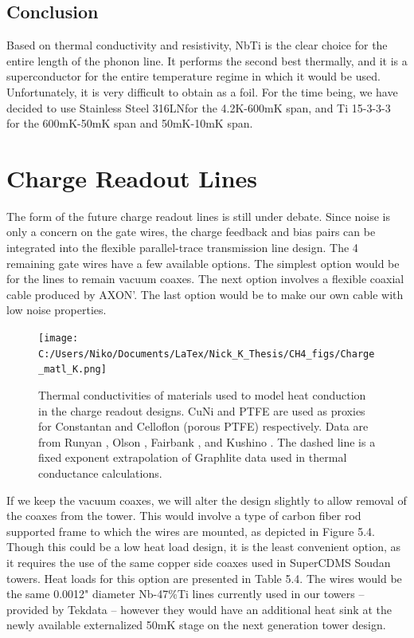 \documentclass{report}
\begin{document}
\subsection{Conclusion}

Based on thermal conductivity and resistivity, NbTi is the clear choice for the entire length of the phonon line. It performs the second best thermally, and it is a superconductor for the entire temperature regime in which it would be used. Unfortunately, it is very difficult to obtain as a foil. For the time being, we have decided to use Stainless Steel 316LN\footnotemark for the 4.2K-600mK span,
and Ti 15-3-3-3 for the 600mK-50mK span and 50mK-10mK span.\footnotemark


\section{Charge Readout Lines}

The form of the future charge readout lines is still under debate. Since noise is only a concern on the gate wires, the charge feedback and bias pairs can be integrated into the flexible parallel-trace transmission line design. The 4 remaining gate wires have a few available options. The simplest option would be for the lines to remain vacuum coaxes. The next option involves a flexible coaxial cable produced by AXON'. The last option would be to make our own cable with low noise properties.

\begin{figure}[ht]
\centering
\texttt{[image: C:/Users/Niko/Documents/LaTex/Nick\_K\_Thesis/CH4\_figs/Charge\_matl\_K.png]}
\caption{Thermal conductivities of materials used to model heat conduction in the charge readout designs. CuNi and PTFE are used as proxies for Constantan and Celloflon (porous PTFE) respectively. Data are from Runyan \cite{run}, Olson \cite{ols}, Fairbank \cite{fair}, and Kushino \cite{kus:cu}. The dashed line is a fixed exponent extrapolation of Graphlite data used in thermal conductance calculations.}
\end{figure}

If we keep the vacuum coaxes, we will alter the design slightly to allow removal of the coaxes from the tower. This would involve a type of carbon fiber rod supported frame to which the wires are mounted, as depicted in Figure 5.4. Though this could be a low heat load design, it is the least convenient option, as it requires the use of the same copper side coaxes used in SuperCDMS Soudan towers. Heat loads for this option are presented in Table 5.4. The wires would be the same 0.0012" diameter Nb-47\%Ti lines currently used in our towers -- provided by Tekdata -- however they would have an additional heat sink at the newly available externalized 50mK stage on the next generation tower design.
\end{document}
